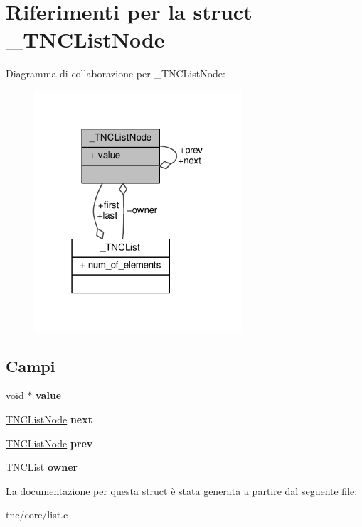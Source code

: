 \hypertarget{struct__TNCListNode}{}\section{Riferimenti per la struct \+\_\+\+T\+N\+C\+List\+Node}
\label{struct__TNCListNode}


Diagramma di collaborazione per \+\_\+\+T\+N\+C\+List\+Node\+:
\nopagebreak
\begin{figure}[H]
\begin{center}
\leavevmode
\includegraphics[width=219pt]{struct__TNCListNode__coll__graph}
\end{center}
\end{figure}
\subsection*{Campi}
\begin{DoxyCompactItemize}
\item 
\hypertarget{struct__TNCListNode_a287945e146b44b7dc0417ec1f22c9abd}{}void $\ast$ {\bfseries value}\label{struct__TNCListNode_a287945e146b44b7dc0417ec1f22c9abd}

\item 
\hypertarget{struct__TNCListNode_aa7ee63b07196f39368c16d1261a2ad2f}{}\hyperlink{list_8h_a191e145c71bdead687daa62aaf197419}{T\+N\+C\+List\+Node} {\bfseries next}\label{struct__TNCListNode_aa7ee63b07196f39368c16d1261a2ad2f}

\item 
\hypertarget{struct__TNCListNode_af952ce1c4cc6d730e46d56135e000ed5}{}\hyperlink{list_8h_a191e145c71bdead687daa62aaf197419}{T\+N\+C\+List\+Node} {\bfseries prev}\label{struct__TNCListNode_af952ce1c4cc6d730e46d56135e000ed5}

\item 
\hypertarget{struct__TNCListNode_a6d75821b245646b8a8ebaa4a23f3ff2e}{}\hyperlink{list_8h_a6234acd44af21902b91273ccdd278bf6}{T\+N\+C\+List} {\bfseries owner}\label{struct__TNCListNode_a6d75821b245646b8a8ebaa4a23f3ff2e}

\end{DoxyCompactItemize}


La documentazione per questa struct è stata generata a partire dal seguente file\+:\begin{DoxyCompactItemize}
\item 
tnc/core/list.\+c\end{DoxyCompactItemize}
